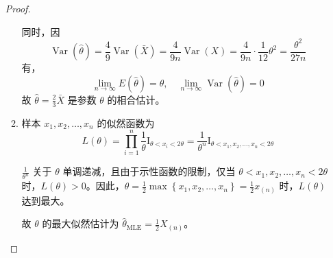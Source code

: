 \documentclass[normal,founder,mtpro2,cn]{elegantnote}
\begin{document}
\begin{enumerate}
\begin{proof}
\begin{enumerate}
                      同时，因
                      \begin{equation*}
                          \operatorname{Var}(\hat{\theta})=\frac{4}{9}\operatorname{Var}(\bar{X})=\frac{4}{9n}\operatorname{Var}(X)=\frac{4}{9n}\cdot\frac{1}{12}\theta^{2}=\frac{\theta^{2}}{27n}
                      \end{equation*}
                      有，
                      \begin{equation*}
                          \lim_{n\rightarrow\infty}E(\hat{\theta})=\theta,\quad\lim_{n\rightarrow\infty}\operatorname{Var}(\hat{\theta})=0
                      \end{equation*}
                      故 $\hat{\theta}=\frac{2}{3}\bar{X}$ 是参数 $\theta$ 的相合估计。
                \item
                      样本 $x_{1},x_{2},\ldots,x_{n}$ 的似然函数为
                      \begin{equation*}
                          L(\theta)=\prod_{i=1}^{n}\frac{1}{\theta}\mathrm{I}_{\theta<x_{i}<2\theta}=\frac{1}{\theta^{n}}\mathrm{I}_{\theta<x_{1},x_{2},\ldots,x_{n}<2\theta}
                      \end{equation*}

                      $\frac{1}{\theta^{n}}$ 关于 $\theta$ 单调递减，且由于示性函数的限制，仅当 $\theta<x_{1},x_{2},\ldots,x_{n}<2\theta$ 时，$L(\theta)>0$。因此，$\theta=\frac{1}{2}\max\left\{x_{1},x_{2},\ldots,x_{n}\right\}=\frac{1}{2}x_{(n)}$ 时，$L(\theta)$ 达到最大。

                      故 $\theta$ 的最大似然估计为 $\hat{\theta}_{\text{MLE}}=\frac{1}{2}X_{(n)}$。


\end{enumerate}
\end{proof}
\end{enumerate}
\end{document}
